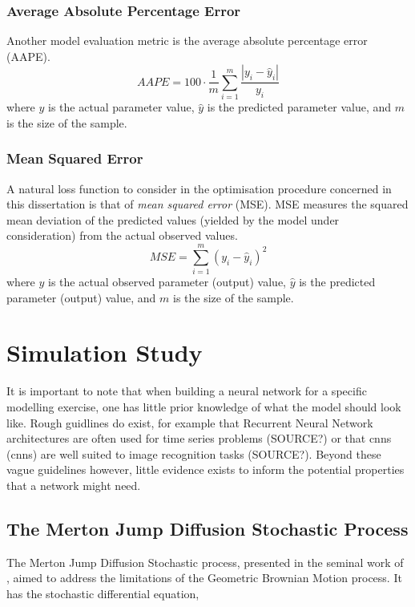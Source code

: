 \documentclass[11pt,oneside,openany,a4paper,english, report, goldenblock
]{usthesis}
\begin{document}
\subsection{Average Absolute Percentage Error}
Another model evaluation metric is the average absolute percentage error (AAPE).
\begin{equation}
AAPE = 100 \cdot \frac{1}{m} \sum_{i=1}^{m} \frac{\left| y_i - \hat{y}_i \right|}{y_i}
\end{equation}
where $y$ is the actual parameter value, $\hat{y}$ is the predicted parameter value, and $m$ is the size of the sample.

\subsection{Mean Squared Error}
A natural loss function to consider in the optimisation procedure concerned in this dissertation is that of \textit{mean squared error} (MSE). MSE measures the squared mean deviation of the predicted values (yielded by the model under consideration) from the actual observed values.
\begin{equation}
MSE = \sum_{i=1}^{m}\left(y_i-\hat{y}_i\right)^2
\end{equation}
where $y$ is the actual observed parameter (output) value, $\hat{y}$ is the predicted parameter (output) value, and $m$ is the size of the sample.

\chapter{Simulation Study}
\label{chapter:simulation_study}

It is important to note that when building a neural network for a specific modelling exercise, one has little prior knowledge of what the model should look like. Rough guidlines do exist, for example that Recurrent Neural Network architectures are often used for time series problems (SOURCE?) or that \acrlong{cnn}s (\acrshort{cnn}s) are well suited to image recognition tasks (SOURCE?). Beyond these vague guidelines however, little evidence exists to inform the potential properties that a network might need.

\section{The Merton Jump Diffusion Stochastic Process}

The Merton Jump Diffusion Stochastic process, presented in the seminal work of \citet{Merton}, aimed to address the limitations of the Geometric Brownian Motion process. It has the stochastic differential equation,
\end{document}
